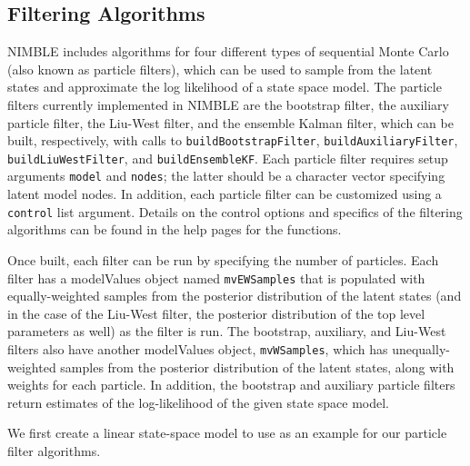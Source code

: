 \documentclass[12pt,oneside]{book}\usepackage[]{graphicx}\usepackage[]{color}
\def\cd#1{\texttt{#1}}
\begin{document}
\subsection{Filtering Algorithms}

  NIMBLE includes algorithms for four different types of sequential Monte Carlo (also known as particle filters), which can be used to sample from the latent states and approximate the log likelihood of a state space model.  The particle filters currently implemented in NIMBLE are the bootstrap filter, the auxiliary particle filter, the Liu-West filter, and the ensemble Kalman filter, which can be built, respectively, with calls to \cd{buildBootstrapFilter}, \cd{buildAuxiliaryFilter}, \cd{buildLiuWestFilter}, and \cd{buildEnsembleKF}.  Each particle filter requires setup arguments  \cd{model} and \cd{nodes}; the latter should be a character vector specifying latent model nodes.  In addition, each particle filter can be customized using a \cd{control} list argument.  Details on the control options and specifics of the filtering algorithms can be found in the help pages for the functions.
  
  Once built, each filter can be run by specifying the number of particles.  Each filter has a modelValues object named \cd{mvEWSamples} that is populated with equally-weighted samples from the posterior distribution of the latent states (and in the case of the Liu-West filter, the posterior distribution of the top level parameters as well) as the filter is run.  The bootstrap, auxiliary, and Liu-West filters also have another modelValues object, \cd{mvWSamples}, which has unequally-weighted samples from the posterior distribution of the latent states, along with weights for each particle.   In addition, the bootstrap and auxiliary particle filters return estimates of the log-likelihood of the given state space model.
  
 We first create a linear state-space model to use as an example for our particle filter algorithms. 
 
\end{document}
